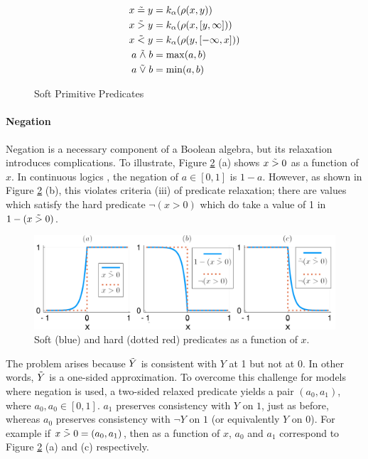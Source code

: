 \begin{figure}\label{softpreds}
  \begin{align*}
x \mathrel{\tilde{=}} y &= k_\alpha(\rho(x, y))\\
x \mathrel{\tilde{>}} y &= k_\alpha(\rho(x, [y, \infty]))\\
x \mathrel{\tilde{<}} y &= k_\alpha(\rho(y, [-\infty, x]))\\
a \mathrel{\tilde{\land}} b &= \max(a, b)\\
a \mathrel{\tilde{\lor}} b &= \min(a, b)
  \end{align*}
\caption{Soft Primitive Predicates}
\end{figure}

\paragraph{Negation}
Negation is a necessary component of a Boolean algebra, but its relaxation introduces complications.
To illustrate, Figure \ref{negationimg} (a) shows $x \mathrel{\tilde{>}} 0$ as a function of $x$.
In continuous logics \cite{kimmig2012short}, the negation of $a \in [0, 1]$ is $1 - a$.
However, as shown in Figure \ref{negationimg} (b), this violates criteria (iii) of predicate relaxation; there are values which satisfy the hard predicate $\neg(x > 0)$ which do take a value of 1 in $1 - (x \mathrel{\tilde{>}} 0)$.

\begin{figure}
\includegraphics[width=\linewidth]{negation.pdf}
\caption{Soft (blue) and hard (dotted red) predicates as a function of $x$.}\label{negationimg}
\end{figure}


The problem arises because $\tilde{Y}$ is consistent with $Y$ at 1 but not at 0.
In other words, $\tilde{Y}$ is a one-sided approximation.
To overcome this challenge for models where negation is used, a two-sided relaxed predicate yields a pair $(a_0, a_1)$, where $a_0, a_0 \in [0, 1]$.
$a_1$ preserves consistency with $Y$ on $1$, just as before, whereas $a_0$ preserves consistency with $\neg Y$ on $1$ (or equivalently $Y$ on 0).
For example if $x \mathrel{\tilde{>}} 0 = (a_0, a_1)$, then as a function of $x$, $a_0$ and $a_1$ correspond to Figure \ref{negationimg} (a) and (c) respectively.

